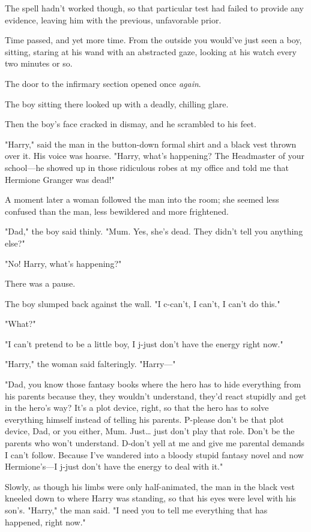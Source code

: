 The spell hadn't worked though, so that particular test had failed to provide 
any evidence, leaving him with the previous, unfavorable prior.

Time passed, and yet more time. From the outside you would've just seen a boy, 
sitting, staring at his wand with an abstracted gaze, looking at his watch 
every two minutes or so.

The door to the infirmary section opened once \emph{again}.

The boy sitting there looked up with a deadly, chilling glare.

Then the boy's face cracked in dismay, and he scrambled to his feet.

"Harry," said the man in the button-down formal shirt and a black vest thrown 
over it. His voice was hoarse. "Harry, what's happening? The Headmaster of your 
school---he showed up in those ridiculous robes at my office and told me that 
Hermione Granger was dead!"

A moment later a woman followed the man into the room; she seemed less confused 
than the man, less bewildered and more frightened.

"Dad," the boy said thinly. "Mum. Yes, she's dead. They didn't tell you 
anything else?"

"No! Harry, what's happening?"

There was a pause.

The boy slumped back against the wall. "I c-can't, I can't, I can't do this."

"What?"

"I can't pretend to be a little boy, I j-just don't have the energy right now."

"Harry," the woman said falteringly. "Harry---"

"Dad, you know those fantasy books where the hero has to hide everything from 
his parents because they, they wouldn't understand, they'd react stupidly and 
get in the hero's way? It's a plot device, right, so that the hero has to solve 
everything himself instead of telling his parents. P-please don't be that plot 
device, Dad, or you either, Mum. Just{\ldots} just don't play that role. Don't 
be the parents who won't understand. D-don't yell at me and give me parental 
demands I can't follow. Because I've wandered into a bloody stupid fantasy 
novel and now Hermione's---I j-just don't have the energy to deal with it."

Slowly, as though his limbs were only half-animated, the man in the black vest 
kneeled down to where Harry was standing, so that his eyes were level with his 
son's. "Harry," the man said. "I need you to tell me everything that has 
happened, right now."

